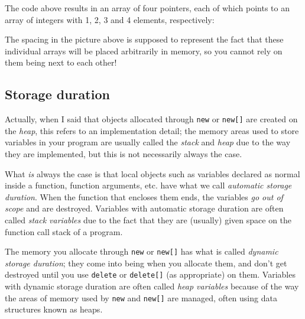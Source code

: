 \documentclass[a4paper]{scrartcl}
\begin{document}
The code above results in an array of four pointers, each of which points to an array of integers with 1, 2, 3 and 4 elements, respectively:


The spacing in the picture above is supposed to represent the fact that these individual arrays will be placed arbitrarily in memory, so you cannot rely on them being next to each other!

\subsection{Storage duration}
Actually, when I said that objects allocated through \verb|new| or \verb|new[]| are created on the \emph{heap}, this refers to an implementation detail; the memory areas used to store variables in your program are usually called the \emph{stack} and \emph{heap} due to the way they are implemented, but this is not necessarily always the case.

What \emph{is} always the case is that local objects such as variables declared as normal inside a function, function arguments, etc. have what we call \emph{automatic storage duration}. When the function that encloses them ends, the variables \emph{go out of scope} and are destroyed. Variables with automatic storage duration are often called \emph{stack variables} due to the fact that they are (usually) given space on the function call stack of a program.

The memory you allocate through \verb|new| or \verb|new[]| has what is called \emph{dynamic storage duration}; they come into being when you allocate them, and don't get destroyed until you use \verb|delete| or \verb|delete[]| (as appropriate) on them. Variables with dynamic storage duration are often called \emph{heap variables} because of the way the areas of memory used by \verb|new| and \verb|new[]| are managed, often using data structures known as heaps.
\end{document}
